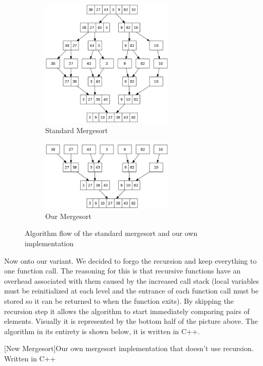 \documentclass[12pt]{article}
\begin{document}
	
\begin{figure}[H]
	
	\begin{subfigure}{0.5\textwidth}
		\includegraphics[width=2.5in]{Merge_sort_algorithm_diagram.png} 
		\caption{Standard Mergesort}
		\label{fig:stdmerge}
	\end{subfigure}
	\begin{subfigure}{0.5\textwidth}
		\includegraphics[width=2.5in]{New_merge_sort_algorithm_diagram.png}
		\caption{Our Mergesort}
		\label{fig:newmerge}
	\end{subfigure}
	
	\caption{Algorithm flow of the standard mergesort and our own implementation}
	\label{fig:bothmerge}
\end{figure}
	
	Now onto our variant. 
	We decided to forgo the recursion and keep everything to one function call. 
	The reasoning for this is that recursive functions have an overhead associated with them caused by the increased call stack (local variables must be reinitialized at each level and the entrance of each function call must be stored so it can be returned to when the function exits). 
	By skipping the recursion step it allows the algorithm to start immediately comparing pairs of elements. 
	Visually it is represented by the bottom half of the picture above. 
	The algorithm in its entirety is shown below, it is written in C++.
	
	\begin{center}
		[New Mergesort]{Our own mergesort implementation that doesn't use recursion. Written in C++}
		
		\label{snip:newmerge}
	\end{center}
\end{document}
